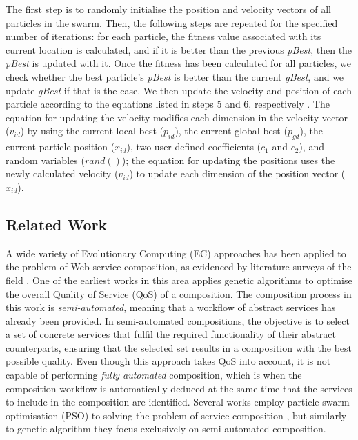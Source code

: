 \documentclass{llncs}
\begin{document}
The first step is to randomly initialise the position and velocity vectors of all particles in the swarm. Then, the following steps are repeated for the specified number of iterations: for each particle, the fitness value associated with its current location is calculated, and if it is better than the previous \textit{pBest}, then the \textit{pBest} is updated with it. Once the fitness has been calculated for all particles, we check whether the best particle's \textit{pBest} is better than the current \textit{gBest}, and we update \textit{gBest} if that is the case. We then update the velocity and position of each particle according to the equations listed in steps 5 and 6, respectively \cite{eberhart2001particle}. The equation for updating the velocity modifies each dimension in the velocity vector ($v_{id}$) by using the current local best ($p_{id}$), the current global best ($p_{gd}$), the current particle position ($x_{id}$), two user-defined coefficients ($c_1$ and $c_2$), and random variables ($rand()$); the equation for updating the positions uses the newly calculated velocity ($v_{id}$) to update each dimension of the position vector ($x_{id}$).

\subsection{Related Work}

A wide variety of Evolutionary Computing (EC) approaches has been applied to the problem of Web service composition, as evidenced by literature surveys of the field \cite{wang2012survey,pejman2012web}. One of the earliest works in this area \cite{canfora2005approach} applies genetic algorithms to optimise the overall Quality of Service (QoS) of a composition. The composition process in this work is \textit{semi-automated}, meaning that a workflow of abstract services has already been provided. In semi-automated compositions, the objective is to select a set of concrete services that fulfil the required functionality of their abstract counterparts, ensuring that the selected set results in a composition with the best possible quality. Even though this approach takes QoS into account, it is not capable of performing \textit{fully automated} composition, which is when the composition workflow is automatically deduced at the same time that the services to include in the composition are identified. Several works employ particle swarm optimisation (PSO) to solving the problem of service composition \cite{wang2010improved,amiri2012effective,ludwig2012applying,zhao2012improved}, but similarly to genetic algorithm they focus exclusively on semi-automated composition.
\end{document}
